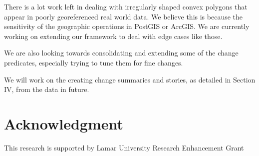 \documentclass[conference]{IEEEtran}
\begin{document}
There is a lot work left in dealing with irregularly shaped convex polygons that appear in poorly georeferenced real world data. We believe this is because the sensitivity of the geographic operations in PostGIS or ArcGIS. We are currently working on extending our framework to deal with edge cases like those.

We are also looking towards consolidating and extending some of the change predicates, especially trying to tune them for fine changes.

We will work on the creating change summaries and stories, as detailed in Section IV,  from the data in future.

\section*{Acknowledgment}

This research is supported by Lamar University Research Enhancement Grant
\end{document}
